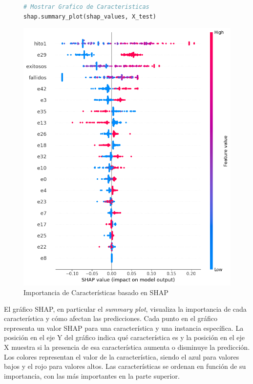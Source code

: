 \begin{figure}[ht]
    \centering
    \begin{minipage}{0.48\textwidth}
        \begin{lstlisting}[language=Python, caption=Grafico de Caracteristicas, label=lst:graf_caracteristicas]
# Mostrar Grafico de Caracteristicas
shap.summary_plot(shap_values, X_test)
        \end{lstlisting}
    \end{minipage}
    \hfill
    \begin{minipage}{0.48\textwidth}
        \centering
        \includegraphics[width=0.9\linewidth]{img/shap_rf/shapForcePlot2.png}
        \caption{Importancia de Características basado en SHAP}
        \label{fig:caract_var_shap}
    \end{minipage}
\end{figure}

El gráfico SHAP, en particular el \textit{summary plot}, visualiza la importancia de cada característica y cómo afectan las predicciones. Cada punto en el gráfico representa un valor SHAP para una característica y una instancia específica. La posición en el eje Y del gráfico indica qué característica es y la posición en el eje X muestra si la presencia de esa característica aumenta o disminuye la predicción. Los colores representan el valor de la característica, siendo el azul para valores bajos y el rojo para valores altos. Las características se ordenan en función de su importancia, con las más importantes en la parte superior.

